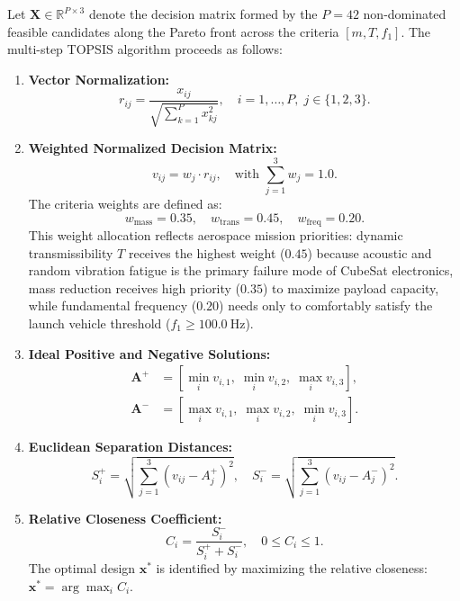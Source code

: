Let $\mathbf{X} \in \mathbb{R}^{P \times 3}$ denote the decision matrix formed by the $P = 42$ non-dominated feasible candidates along the Pareto front across the criteria $[m, T, f_1]$. The multi-step TOPSIS algorithm proceeds as follows:
\begin{enumerate}
\item \textbf{Vector Normalization:}
\begin{equation}
r_{ij} = \frac{x_{ij}}{\sqrt{\sum_{k=1}^P x_{kj}^2}}, \quad i = 1, \dots, P, \; j \in \{1, 2, 3\}.
\label{eq:topsis_norm}
\end{equation}
\item \textbf{Weighted Normalized Decision Matrix:}
\begin{equation}
v_{ij} = w_j \cdot r_{ij}, \quad \text{with } \sum_{j=1}^3 w_j = 1.0.
\label{eq:topsis_weighted}
\end{equation}
The criteria weights are defined as:
\begin{equation}
w_{\text{mass}} = 0.35, \quad w_{\text{trans}} = 0.45, \quad w_{\text{freq}} = 0.20.
\label{eq:topsis_weights}
\end{equation}
This weight allocation reflects aerospace mission priorities: dynamic transmissibility $T$ receives the highest weight ($0.45$) because acoustic and random vibration fatigue is the primary failure mode of CubeSat electronics, mass reduction receives high priority ($0.35$) to maximize payload capacity, while fundamental frequency ($0.20$) needs only to comfortably satisfy the launch vehicle threshold ($f_1 \ge \SI{100.0}{\hertz}$).
\item \textbf{Ideal Positive and Negative Solutions:}
\begin{align}
\mathbf{A}^+ &= \left[ \min_i v_{i,1}, \; \min_i v_{i,2}, \; \max_i v_{i,3} \right], \label{eq:a_plus} \\
\mathbf{A}^- &= \left[ \max_i v_{i,1}, \; \max_i v_{i,2}, \; \min_i v_{i,3} \right]. \label{eq:a_minus}
\end{align}
\item \textbf{Euclidean Separation Distances:}
\begin{equation}
S_i^+ = \sqrt{\sum_{j=1}^3 (v_{ij} - A_j^+)^2}, \quad S_i^- = \sqrt{\sum_{j=1}^3 (v_{ij} - A_j^-)^2}.
\label{eq:distances_topsis}
\end{equation}
\item \textbf{Relative Closeness Coefficient:}
\begin{equation}
C_i = \frac{S_i^-}{S_i^+ + S_i^-}, \quad 0 \le C_i \le 1.
\label{eq:closeness_topsis}
\end{equation}
The optimal design $\mathbf{x}^*$ is identified by maximizing the relative closeness: $\mathbf{x}^* = \arg\max_{i} C_i$.
\end{enumerate}


